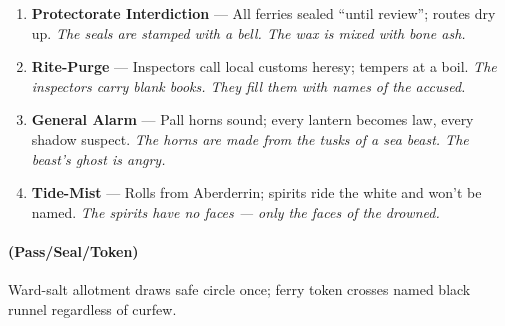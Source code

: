 \begin{enumerate}
\item[J] \textbf{Protectorate Interdiction} --- All ferries sealed ``until review''; routes dry up.  
  \hfill \textit{The seals are stamped with a bell. The wax is mixed with bone ash.}
\item[Q] \textbf{Rite-Purge} --- Inspectors call local customs heresy; tempers at a boil.  
  \hfill \textit{The inspectors carry blank books. They fill them with names of the accused.}
\item[K] \textbf{General Alarm} --- Pall horns sound; every lantern becomes law, every shadow suspect.  
  \hfill \textit{The horns are made from the tusks of a sea beast. The beast's ghost is angry.}
\item[A] \textbf{Tide-Mist} --- Rolls from Aberderrin; spirits ride the white and won't be named.  
  \hfill \textit{The spirits have no faces --- only the faces of the drowned.}
\end{enumerate}

\paragraph*{(Pass/Seal/Token)} Ward-salt allotment draws safe circle once; ferry token crosses named black runnel regardless of curfew.

